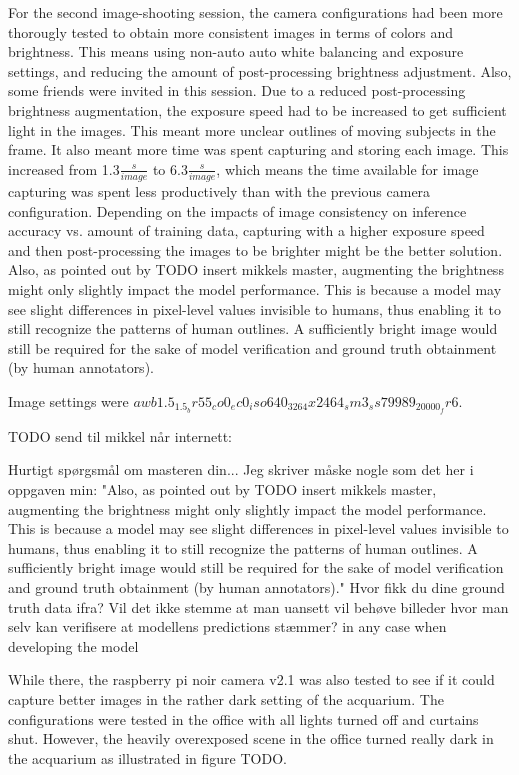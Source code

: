 For the second image-shooting session, the camera configurations had been more thorougly tested to obtain more consistent images in terms of colors and brightness. This means using non-auto auto white balancing and exposure settings, and reducing the amount of post-processing brightness adjustment. Also, some friends were invited in this session. Due to a reduced post-processing brightness augmentation, the exposure speed had to be increased to get sufficient light in the images. This meant more unclear outlines of moving subjects in the frame. It also meant more time was spent capturing and storing each image. This increased from 1.3$\frac{s}{image}$ to 6.3$\frac{s}{image}$, which means the time available for image capturing was spent less productively than with the previous camera configuration. Depending on the impacts of image consistency on inference accuracy vs. amount of training data, capturing with a higher exposure speed and then post-processing the images to be brighter might be the better solution. Also, as pointed out by TODO insert mikkels master, augmenting the brightness might only slightly impact the model performance. This is because a model may see slight differences in pixel-level values invisible to humans, thus enabling it to still recognize the patterns of human outlines. A sufficiently bright image would still be required for the sake of model verification and ground truth obtainment (by human annotators). 

Image settings were $awb1.5_1.5_br55_co0_ec0_iso640_3264x2464_sm3_ss79989_20000_fr6$.


TODO send til mikkel når internett:

Hurtigt spørgsmål om masteren din... Jeg skriver måske nogle som det her i oppgaven min:
"Also, as pointed out by TODO insert mikkels master, augmenting the brightness might only slightly impact the model performance. This is because a model may see slight differences in pixel-level values invisible to humans, thus enabling it to still recognize the patterns of human outlines. A sufficiently bright image would still be required for the sake of model verification and ground truth obtainment (by human annotators)."
Hvor fikk du dine ground truth data ifra? Vil det ikke stemme at man uansett vil behøve billeder hvor man selv kan verifisere at modellens predictions stæmmer? in any case when developing the model






While there, the raspberry pi noir camera v2.1 was also tested to see if it could capture better images in the rather dark setting of the acquarium. The configurations were tested in the office with all lights turned off and curtains shut. However, the heavily overexposed scene in the office turned really dark in the acquarium as illustrated in figure TODO.

